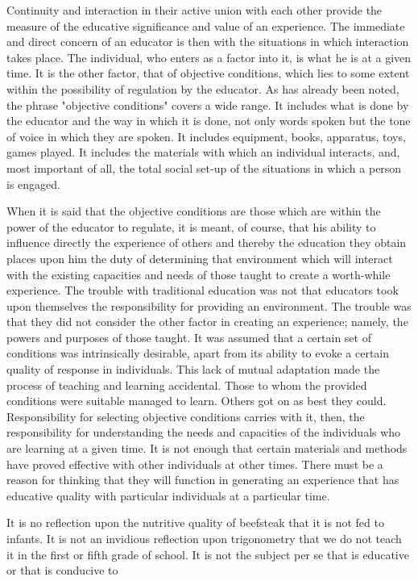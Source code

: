 Continuity and interaction in their active union with each other provide the measure of 
the educative significance and value of an experience. The immediate and direct concern 
of an educator is then with the situations in which interaction takes place. The individual, 
who enters as a factor into it, is what he is at a given time. It is the other factor, that of 
objective conditions, which lies to some extent within the possibility of regulation by the 
educator. As has already been noted, the phrase "objective conditions" covers a wide 
range. It includes what is done by the educator and the way in which it is done, not only 
words spoken but the tone of voice in which they are spoken. It includes equipment, 
books, apparatus, toys, games played. It includes the materials with which an individual 
interacts, and, most important of all, the total social set-up of the situations in which a 
person is engaged. 

When it is said that the objective conditions are those which are within the power of 
the educator to regulate, it is meant, of course, that his ability to influence directly the 
experience of others and thereby the education they obtain places upon him the duty of 
determining that environment which will interact with the existing capacities and needs 
of those taught to create a worth-while experience. The trouble with traditional education 
was not that educators took upon themselves the responsibility for providing an 
environment. The trouble was that they did not consider the other factor in creating an 
experience; namely, the powers and purposes of those taught. It was assumed that a 
certain set of conditions was intrinsically desirable, apart from its ability to evoke a 
certain quality of response in individuals. This lack of mutual adaptation made the 
process of teaching and learning accidental. Those to whom the provided conditions were 
suitable managed to learn. Others got on as best they could. Responsibility for selecting 
objective conditions carries with it, then, the responsibility for understanding the needs 
and capacities of the individuals who are learning at a given time. It is not enough that 
certain materials and methods have proved effective with other individuals at other times. 
There must be a reason for thinking that they will function in generating an experience 
that has educative quality with particular individuals at a particular time. 

It is no reflection upon the nutritive quality of beefsteak that it is not fed to infants. It 
is not an invidious reflection upon trigonometry that we do not teach it in the first or fifth 
grade of school. It is not the subject per se that is educative or that is conducive to 



